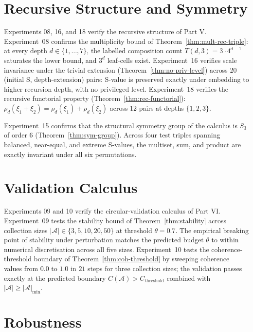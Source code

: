 \documentclass[twocolumn,11pt,a4paper]{article}
\theoremstyle{thmstyle}
\theoremstyle{thmstyle}
\theoremstyle{definition}
\theoremstyle{remark}
\begin{document}
\section{Recursive Structure and Symmetry}
\label{sec:val-recursion}

Experiments 08, 16, and 18 verify the recursive
structure of Part V.
Experiment~08 confirms the multiplicity bound
of Theorem~\ref{thm:mult-rec-triple}: at every
depth $d \in \{1, \ldots, 7\}$, the labelled
composition count $T(d, 3) = 3 \cdot 4^{d-1}$
saturates the lower bound, and $3^d$ leaf-cells
exist.
Experiment~16 verifies scale invariance under the
trivial extension (Theorem~\ref{thm:no-priv-level})
across 20 (initial S, depth-extension) pairs:
S-value is preserved exactly under embedding to
higher recursion depth, with no privileged level.
Experiment~18 verifies the recursive functorial
property (Theorem~\ref{thm:rec-functorial}):
$\rho_d(\xi_1 + \xi_2) = \rho_d(\xi_1) +
\rho_d(\xi_2)$ across 12 pairs at depths
$\{1, 2, 3\}$.

Experiment~15 confirms that the structural
symmetry group of the calculus is $S_3$ of order
$6$ (Theorem~\ref{thm:sym-group}). Across four
test triples spanning balanced, near-equal, and
extreme S-values, the multiset, sum, and product
are exactly invariant under all six permutations.

\section{Validation Calculus}
\label{sec:val-calculus}

Experiments 09 and 10 verify the circular-validation
calculus of Part VI.
Experiment~09 tests the stability bound of
Theorem~\ref{thm:stability} across collection sizes
$|\mathcal{A}| \in \{3, 5, 10, 20, 50\}$ at
threshold $\theta = 0.7$. The empirical breaking
point of stability under perturbation matches the
predicted budget $\theta$ to within numerical
discretisation across all five sizes.
Experiment~10 tests the coherence-threshold
boundary of Theorem~\ref{thm:coh-threshold} by
sweeping coherence values from $0.0$ to $1.0$ in
$21$ steps for three collection sizes; the
validation passes exactly at the predicted
boundary $C(\mathcal{A}) > C_\mathrm{threshold}$
combined with $|\mathcal{A}| \geq |\mathcal{A}|_\mathrm{min}$.

\section{Robustness}
\label{sec:val-robustness}
\end{document}
